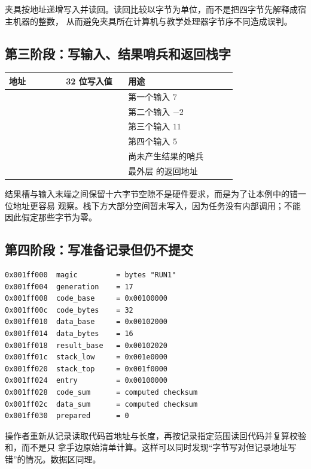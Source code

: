 夹具按地址递增写入并读回。读回比较以字节为单位，而不是把四字节先解释成宿主机器的整数，
从而避免夹具所在计算机与教学处理器字节序不同造成误判。

\subsection{第三阶段：写输入、结果哨兵和返回栈字}

\begin{longtable}{|L{0.22\linewidth}|L{0.24\linewidth}|L{0.42\linewidth}|}
\hline
{}
地址 & 32 位写入值 & 用途 \\ \hline
{} &  & 第一个输入 \(7\) \\ \hline
{} &  & 第二个输入 \(-2\) \\ \hline
{} &  & 第三个输入 \(11\) \\ \hline
{} &  & 第四个输入 \(5\) \\ \hline
{} &  & 尚未产生结果的哨兵 \\ \hline
{} &  & 最外层  的返回地址 \\ \hline
\end{longtable}

结果槽与输入末端之间保留十六字节空隙不是硬件要求，而是为了让本例中的错一位地址更容易
观察。栈下方大部分空间暂未写入，因为任务没有内部调用；不能因此假定那些字节为零。

\subsection{第四阶段：写准备记录但仍不提交}

\begin{lstlisting}
0x001ff000  magic         = bytes "RUN1"
0x001ff004  generation    = 17
0x001ff008  code_base     = 0x00100000
0x001ff00c  code_bytes    = 32
0x001ff010  data_base     = 0x00102000
0x001ff014  data_bytes    = 16
0x001ff018  result_base   = 0x00102020
0x001ff01c  stack_low     = 0x001e0000
0x001ff020  stack_top     = 0x001f0000
0x001ff024  entry         = 0x00100000
0x001ff028  code_sum      = computed checksum
0x001ff02c  data_sum      = computed checksum
0x001ff030  prepared      = 0
\end{lstlisting}

操作者重新从记录读取代码首地址与长度，再按记录指定范围读回代码并复算校验和，而不是只
拿手边原始清单计算。这样可以同时发现“字节写对但记录地址写错”的情况。数据区同理。

